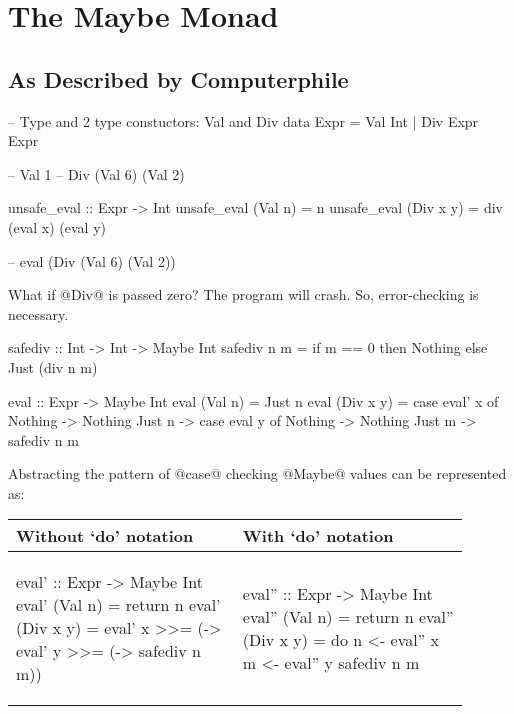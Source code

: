 \chapter{The Maybe Monad}

\section{As Described by Computerphile \cite{riley2017}}

\begin{code}
-- Type and 2 type constuctors: Val and Div
data Expr = Val Int | Div Expr Expr

-- Val 1
-- Div (Val 6) (Val 2)

unsafe_eval :: Expr -> Int
unsafe_eval (Val n) = n
unsafe_eval (Div x y) = div (eval x) (eval y)

-- eval (Div (Val 6) (Val 2))
\end{code}

What if @Div@ is passed zero?  The program will crash. So, error-checking is
necessary.

\begin{code}
safediv :: Int -> Int -> Maybe Int
safediv n m = if m == 0 then Nothing else Just (div n m)

eval :: Expr -> Maybe Int
eval (Val n)   = Just n
eval (Div x y) = case eval' x of
                   Nothing -> Nothing
                   Just n  -> case eval y of
                             Nothing -> Nothing
                             Just m  -> safediv n m
\end{code}

Abstracting the pattern of @case@ checking @Maybe@ values can be represented
as:

\begin{table}[h]
\begin{tabular}[b]{p{0.45\linewidth} | p{0.45\linewidth}}
\hline
Without `do' notation & With `do' notation \\ \hline
\begin{code}[frame=shadowbox]
eval' :: Expr -> Maybe Int
eval' (Val n)   = return n
eval' (Div x y) =
  eval' x >>= (\n ->
    eval' y >>= (\m ->
      safediv n m))
\end{code} &
\begin{code}
eval'' :: Expr -> Maybe Int
eval'' (Val n)   = return n
eval'' (Div x y) = do
  n <- eval'' x
  m <- eval'' y
  safediv n m
\end{code}
\end{tabular}
\end{table}
